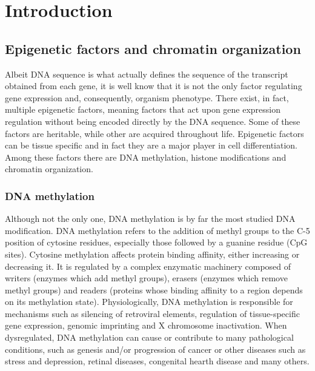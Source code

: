 \graphicspath{{chapters/02_introduction/images}}
\chapter{Introduction}


\section{Epigenetic factors and chromatin organization}
Albeit DNA sequence is what actually defines the sequence of the transcript obtained from each gene, it is well know that it is not the only factor regulating gene expression and, consequently, organism phenotype. There exist, in fact, multiple epigenetic factors, meaning factors that act upon gene expression regulation without being encoded directly by the DNA sequence. Some of these factors are heritable, while other are acquired throughout life. Epigenetic factors can be tissue specific and in fact they are a major player in cell differentiation. Among these factors there are DNA methylation, histone modifications and chromatin organization\cite{epigeneticbook2020}.

\subsection{DNA methylation}
Although not the only one, DNA methylation is by far the most studied DNA modification. DNA methylation refers to the addition of methyl groups to the C-5 position of cytosine residues, especially those followed by a guanine residue (CpG sites). Cytosine methylation affects protein binding affinity, either increasing or decreasing it. It is regulated by a complex enzymatic machinery composed of writers (enzymes which add methyl groups), erasers (enzymes which remove methyl groups) and readers (proteins whose binding affinity to a region depends on its methylation state). Physiologically, DNA methylation is responsible for mechanisms such as silencing of retroviral elements, regulation of tissue-specific gene expression, genomic imprinting and X chromosome inactivation\cite{methylationgeneral2012, methylationhistoric2022}. When dysregulated, DNA methylation can cause or contribute to many pathological conditions, such as genesis and/or progression of cancer\cite{methylationcancer2016, methylationcancer2021} or other diseases such as stress and depression\cite{methylationdepression2023}, retinal diseases\cite{methylationretinal2023}, congenital hearth disease \cite{methylationheart2021} and many others\cite{epigeneticbook2020}.

